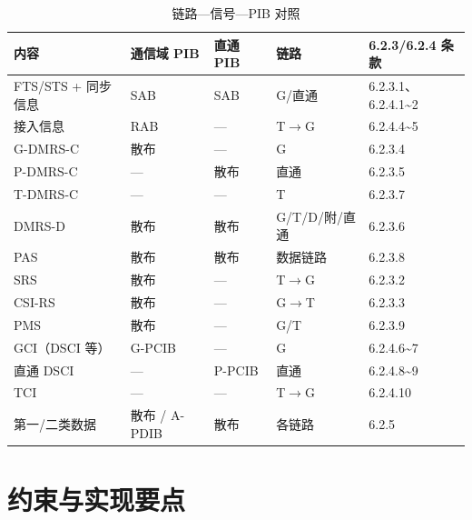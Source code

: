 \documentclass[11pt,a4paper]{ctexart}
\begin{document}
\begin{longtable}{L{3.2cm}L{2cm}L{2.2cm}L{2.2cm}L{4.5cm}}
\caption{链路—信号—PIB 对照} \\
\toprule
\textbf{内容} & \textbf{通信域 PIB} & \textbf{直通 PIB} & \textbf{链路} & \textbf{6.2.3/6.2.4 条款} \\
\midrule
FTS/STS + 同步信息 & SAB & SAB & G/直通 & 6.2.3.1、6.2.4.1\textasciitilde 2 \\
接入信息 & RAB & --- & T$\rightarrow$G & 6.2.4.4\textasciitilde 5 \\
G-DMRS-C & 散布 & --- & G & 6.2.3.4 \\
P-DMRS-C & --- & 散布 & 直通 & 6.2.3.5 \\
T-DMRS-C & --- & --- & T & 6.2.3.7 \\
DMRS-D & 散布 & 散布 & G/T/D/附/直通 & 6.2.3.6 \\
PAS & 散布 & 散布 & 数据链路 & 6.2.3.8 \\
SRS & 散布 & --- & T$\rightarrow$G & 6.2.3.2 \\
CSI-RS & 散布 & --- & G$\rightarrow$T & 6.2.3.3 \\
PMS & 散布 & --- & G/T & 6.2.3.9 \\
GCI（DSCI 等） & G-PCIB & --- & G & 6.2.4.6\textasciitilde 7 \\
直通 DSCI & --- & P-PCIB & 直通 & 6.2.4.8\textasciitilde 9 \\
TCI & --- & --- & T$\rightarrow$G & 6.2.4.10 \\
第一/二类数据 & 散布 / A-PDIB & 散布 & 各链路 & 6.2.5 \\
\bottomrule
\end{longtable}

\section{约束与实现要点}
\end{document}
